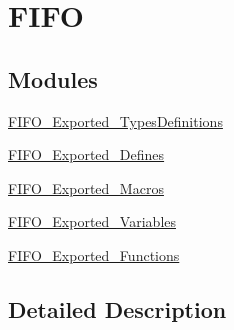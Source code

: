\hypertarget{group___f_i_f_o}{}\section{F\+I\+FO}
\label{group___f_i_f_o}
\subsection*{Modules}
\begin{DoxyCompactItemize}
\item 
\mbox{\hyperlink{group___f_i_f_o___exported___types_definitions}{F\+I\+F\+O\+\_\+\+Exported\+\_\+\+Types\+Definitions}}
\item 
\mbox{\hyperlink{group___f_i_f_o___exported___defines}{F\+I\+F\+O\+\_\+\+Exported\+\_\+\+Defines}}
\item 
\mbox{\hyperlink{group___f_i_f_o___exported___macros}{F\+I\+F\+O\+\_\+\+Exported\+\_\+\+Macros}}
\item 
\mbox{\hyperlink{group___f_i_f_o___exported___variables}{F\+I\+F\+O\+\_\+\+Exported\+\_\+\+Variables}}
\item 
\mbox{\hyperlink{group___f_i_f_o___exported___functions}{F\+I\+F\+O\+\_\+\+Exported\+\_\+\+Functions}}
\end{DoxyCompactItemize}


\subsection{Detailed Description}
